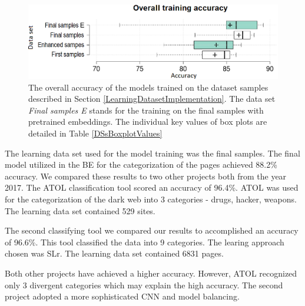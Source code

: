  \begin{figure}[t]
    \includegraphics[width =\textwidth]{Images/DSsBoxplot.png}
    \caption{The overall accuracy of the models trained on the dataset samples described in Section \ref{LearningDatasetImplementation}. The data set \textit{Final samples E} stands for the training on the final samples with pretrained embeddings. The individual key values of box plots are detailed in Table \ref{DSsBoxplotValues} }
    \label{DSsBoxplot}
\end{figure}

\FloatBarrier
The learning data set used for the model training was the final samples. The final model utilized in the BE for the categorization of the pages achieved 88.2\% accuracy. We compared these results to two other projects both from the year 2017. The ATOL \cite{atol} classification tool scored an accuracy of 96.4\%. ATOL was used for the categorization of the dark web into 3 categories - drugs, hacker, weapons. The learning data set contained 529 sites. 

The second classifying tool \cite{classificationProject} we compared our results to accomplished an accuracy of 96.6\%. This tool classified the data into 9 categories. The learing approach chosen was SLr. The learning data set contained 6831 pages. 

Both other projects have achieved a higher accuracy. However, ATOL recognized only 3 divergent categories which may explain the high accuracy. The second project adopted a more sophisticated CNN and model balancing. 

